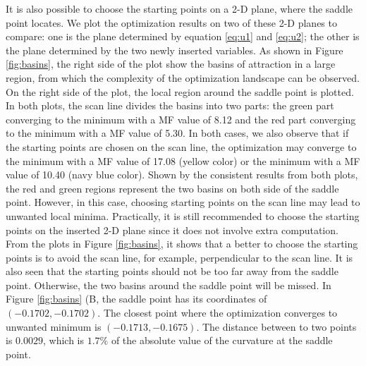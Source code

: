 It is also possible to choose the starting points on a 2-D plane, where the saddle point locates. We plot the optimization results on two of these 2-D planes to compare: one is the plane determined by equation \ref{eq:u1} and \ref{eq:u2}; the other is the plane determined by the two newly inserted variables. As shown in Figure \ref{fig:basins}, the right side of the plot show the basins of attraction in a large region, from which the complexity of the optimization landscape can be observed. On the right side of the plot, the local region around the saddle point is plotted. In both plots, the scan line divides the basins into two parts: the green part converging to the minimum with a MF value of 8.12 and the red part converging to the minimum with a MF value of 5.30. In both cases, we also observe that if the starting points are chosen on the scan line, the optimization may converge to the minimum with a MF value of 17.08 (yellow color) or the minimum with a MF value of 10.40 (navy blue color). Shown by the consistent results from both plots, the red and green regions represent the two basins on both side of the saddle point. However, in this case, choosing starting points on the scan line may lead to unwanted local minima. Practically, it is still recommended to choose the starting points on the inserted 2-D plane since it does not involve extra computation. From the plots in Figure \ref{fig:basins}, it shows that a better to choose the starting points is to avoid the scan line, for example, perpendicular to the scan line. It is also seen that the starting points should not be too far away from the saddle point. Otherwise, the two basins around the saddle point will be missed. In Figure \ref{fig:basins} (B, the saddle point has its coordinates of $(-0.1702,-0.1702)$. The closest point where the optimization converges to unwanted minimum is $(-0.1713, -0.1675)$. The distance between to two points is $0.0029$, which is $1.7\%$ of the absolute value of the curvature at the saddle point. 
